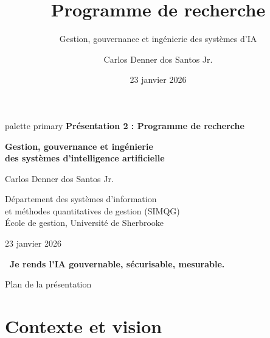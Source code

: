 \documentclass[aspectratio=169,11pt]{beamer}
\title[Programme de recherche]{Programme de recherche}
\subtitle{Gestion, gouvernance et ingénierie des systèmes d'IA}
\author[C. D. dos Santos]{Carlos Denner dos Santos Jr.}
\institute[UdeS - SIMQG]{
  Département des systèmes d'information\\
  et méthodes quantitatives de gestion (SIMQG)\\
  École de gestion, Université de Sherbrooke
}
\date{23 janvier 2026}
\begin{document}
\begin{frame}
  \begin{beamercolorbox}[wd=\paperwidth,ht=2.5cm,dp=0.5cm,center]{palette primary}
    {\Large\bfseries Présentation 2 : Programme de recherche}
  \end{beamercolorbox}
  
  \vspace{0.3cm}
  
  \begin{center}
    {\large\textbf{Gestion, gouvernance et ingénierie\\des systèmes d'intelligence artificielle}}
    
    \vspace{0.8em}
    
    {\Large Carlos Denner dos Santos Jr.}
    
    \vspace{0.5em}
    
    {\normalsize Département des systèmes d'information\\
    et méthodes quantitatives de gestion (SIMQG)\\
    École de gestion, Université de Sherbrooke}
    
    \vspace{0.3em}
    
    {\normalsize 23 janvier 2026}
    
    \vspace{0.8em}
    
    {\large\textcolor{ushervert}{\textbf{\guillemotleft~Je rends l'IA gouvernable, sécurisable, mesurable.~\guillemotright}}}
  \end{center}
\end{frame}

\begin{frame}{Plan de la présentation}
  \tableofcontents
\end{frame}

\section{Contexte et vision}
\end{document}
